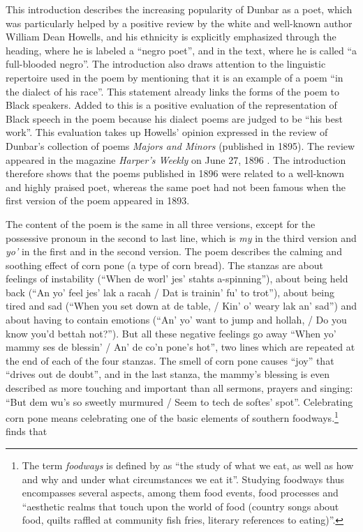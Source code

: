 This introduction describes the increasing popularity of Dunbar as a poet, which was particularly helped by a positive review by the white and well-known author William Dean Howells, and his ethnicity is explicitly emphasized through the heading, where he is labeled a “negro poet”, and in the text, where he is called “a full-blooded negro”. The introduction also draws attention to the linguistic repertoire used in the poem by mentioning that it is an example of a poem “in the dialect of his race”. This statement already links the forms of the poem to Black speakers. Added to this is a positive evaluation of the representation of Black speech in the poem because his dialect poems are judged to be “his best work”. This evaluation takes up Howells’ opinion expressed in the review of Dunbar’s collection of poems \emph{Majors and Minors} (published in 1895). The review appeared in the magazine \emph{Harper’s Weekly} on June 27, 1896 \citep[80]{Nettels1988}. The introduction therefore shows that the poems published in 1896 were related to a well-known and highly praised poet, whereas the same poet had not been famous when the first version of the poem appeared in 1893.

The content of the poem is the same in all three versions, except for the possessive pronoun in the second to last line, which is \emph{my} in the third version and \emph{yo’} in the first and in the second version. The poem describes the calming and soothing effect of corn pone (a type of corn bread). The stanzas are about feelings of instability (“When de worl’ jes’ stahts a-spinning”), about being held back (“An yo’ feel jes’ lak a racah / Dat is trainin’ fu’ to trot”), about being tired and sad (“When you set down at de table, / Kin’ o’ weary lak an’ sad”) and about having to contain emotions (“An’ yo’ want to jump and hollah, / Do you know you’d bettah not?”). But all these negative feelings go away “When yo’ mammy ses de blessin’ / An’ de co’n pone’s hot”, two lines which are repeated at the end of each of the four stanzas. The smell of corn pone causes “joy” that “drives out de doubt”, and in the last stanza, the mammy’s blessing is even described as more touching and important than all sermons, prayers and singing: “But dem wu’s so sweetly murmured / Seem to tech de softes’ spot”. Celebrating corn pone means celebrating one of the basic elements of southern foodways.\footnote{The term \textit{foodways} is defined by \citet[97]{Edge2009} as “the study of what we eat, as well as how and why and under what circumstances we eat it”. Studying foodways thus encompasses several aspects, among them food events, food processes and “aesthetic realms that touch upon the world of food (country songs about food, quilts raffled at community fish fries, literary references to eating)”.} \citet[98]{Edge2009} finds that

